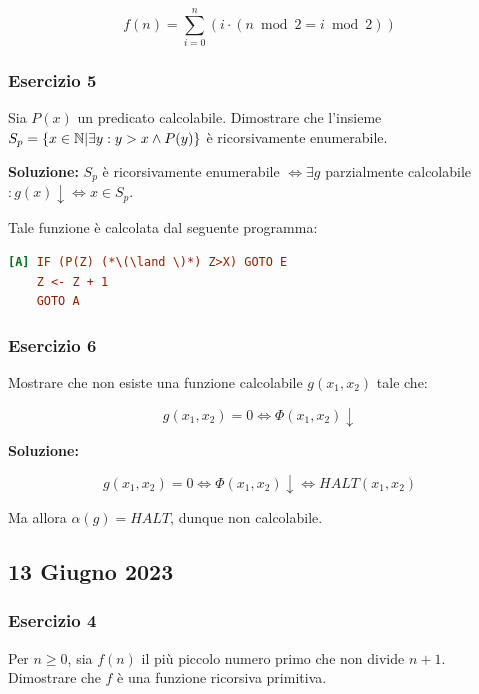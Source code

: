 \begin{equation}
  f(n) = \sum_{i=0}^{n} (i \cdot (n \bmod 2 = i \bmod 2))
\end{equation}

\subsubsection{Esercizio 5}

Sia \(P(x)\) un predicato calcolabile. Dimostrare che l'insieme \(S_p=\displaystyle{\left\{{x \in \mathbb{N}\vert \exists y : y>x \land P(y)}\right\}}\) è ricorsivamente enumerabile.

\textbf{Soluzione: } \(S_p\) è ricorsivamente enumerabile \(\iff \exists g\) parzialmente calcolabile \(: g(x) \downarrow \iff x \in S_p\).

Tale funzione è calcolata dal seguente programma:

\begin{lstlisting}[language=ini, caption={ }]
[A] IF (P(Z) (*\(\land \)*) Z>X) GOTO E
    Z <- Z + 1
    GOTO A
\end{lstlisting}

\subsubsection{Esercizio 6}

Mostrare che non esiste una funzione calcolabile \(g(x_1,x_2)\) tale che:

\begin{equation}
  g(x_1,x_2) = 0 \iff \Phi(x_1,x_2) \downarrow
\end{equation}

\textbf{Soluzione: }

\begin{equation}
  g(x_1,x_2) = 0 \iff \Phi(x_1,x_2) \downarrow \iff HALT(x_1,x_2)
\end{equation}

Ma allora \(\alpha(g)=HALT\), dunque non calcolabile.

\subsection{13 Giugno 2023}

\subsubsection{Esercizio 4}

Per \(n \geq 0\), sia \(f(n)\) il più piccolo numero primo che non divide \(n+1\). Dimostrare che \(f\) è una funzione ricorsiva primitiva.

